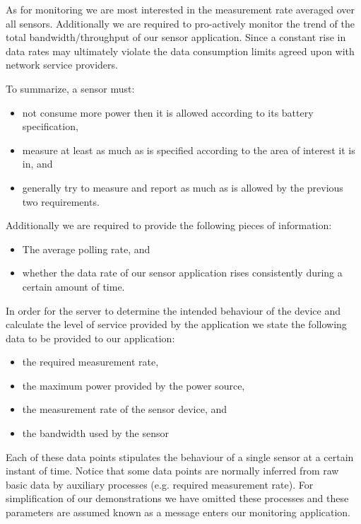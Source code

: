 As for monitoring we are most interested in the measurement rate averaged over all sensors. Additionally we are required to pro-actively monitor the trend of the total bandwidth/throughput of our sensor application. Since a constant rise in data rates may ultimately violate the data consumption limits agreed upon with network service providers.

To summarize, a sensor must:
\begin{itemize}
\nospace
\item not consume more power then it is allowed according to its battery specification,
\item measure at least as much as is specified according to the area of interest it is in, and
\item generally try to measure and report as much as is allowed by the previous two requirements.
\end{itemize}
Additionally we are required to provide the following pieces of information:
\begin{itemize}
\nospace
\item The average polling rate, and
\item whether the data rate of our sensor application rises consistently during a certain amount of time.
\end{itemize}

In order for the server to determine the intended behaviour of the device and calculate the level of service provided by the application we state the following data to be provided to our application:
\begin{itemize}
\nospace
\item the required measurement rate,
\item the maximum power provided by the power source,
\item the measurement rate of the sensor device, and
\item the bandwidth used by the sensor 
\end{itemize}
Each of these data points stipulates the behaviour of a single sensor at a certain instant of time. Notice that some data points are normally inferred from raw basic data by auxiliary processes (e.g. required measurement rate). For simplification of our demonstrations we have omitted these processes and these parameters are assumed known as a message enters our monitoring application.


